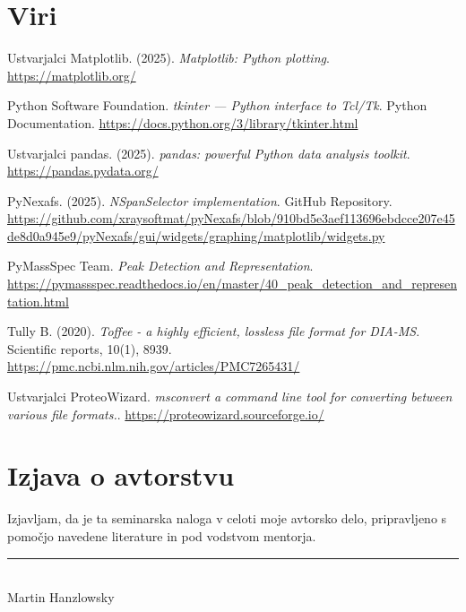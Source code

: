 \documentclass[a4paper,12pt]{article}
\begin{document}
\section{Viri}
\begin{thebibliography}{9}
Ustvarjalci Matplotlib. (2025). \textit{Matplotlib: Python plotting}. \url{https://matplotlib.org/}

 Python Software Foundation. \textit{tkinter — Python interface to Tcl/Tk}. Python Documentation. \url{https://docs.python.org/3/library/tkinter.html}

Ustvarjalci pandas. (2025). \textit{pandas: powerful Python data analysis toolkit}. \url{https://pandas.pydata.org/}

 PyNexafs. (2025). \textit{NSpanSelector implementation}. GitHub Repository. \url{https://github.com/xraysoftmat/pyNexafs/blob/910bd5e3aef113696ebdcce207e45de8d0a945e9/pyNexafs/gui/widgets/graphing/matplotlib/widgets.py}

 PyMassSpec Team. \textit{Peak Detection and Representation}. \url{https://pymassspec.readthedocs.io/en/master/40_peak_detection_and_representation.html}

 Tully B. (2020). \textit{Toffee - a highly efficient, lossless file format for DIA-MS}.  Scientific reports, 10(1), 8939. \url{https://pmc.ncbi.nlm.nih.gov/articles/PMC7265431/}

Ustvarjalci ProteoWizard. \textit{msconvert a command line tool for converting between various file formats.}. \url{https://proteowizard.sourceforge.io/}\
\end{thebibliography}
\newpage
\section*{Izjava o avtorstvu}
\begin{minipage}{0.8\textwidth}
Izjavljam, da je ta seminarska naloga v celoti moje avtorsko delo, pripravljeno s pomočjo navedene literature in pod vodstvom mentorja.
\vspace{1.2cm}

\noindent\rule{7cm}{0.4pt}\\
Martin Hanzlowsky
\thispagestyle{empty}
\end{minipage}
\end{document}
